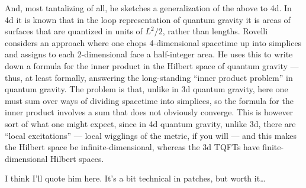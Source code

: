 \documentclass{article}
\begin{document}
And, most tantalizing of all, he sketches a generalization of the above
to 4d. In 4d it is known that in the loop representation of quantum
gravity it is areas of surfaces that are quantized in units of
\(L^2/2\), rather than lengths. Rovelli considers an approach where one
chops 4-dimensional spacetime up into simplices and assigns to each
2-dimensional face a half-integer area. He uses this to write down a
formula for the inner product in the Hilbert space of quantum gravity
--- thus, at least formally, answering the long-standing ``inner product
problem'' in quantum gravity. The problem is that, unlike in 3d quantum
gravity, here one must sum over ways of dividing spacetime into
simplices, so the formula for the inner product involves a sum that does
not obviously converge. This is however sort of what one might expect,
since in 4d quantum gravity, unlike 3d, there are ``local excitations''
--- local wigglings of the metric, if you will --- and this makes the
Hilbert space be infinite-dimensional, whereas the 3d TQFTs have
finite-dimensional Hilbert spaces.

I think I'll quote him here. It's a bit technical in patches, but worth
it\ldots{}
\end{document}
